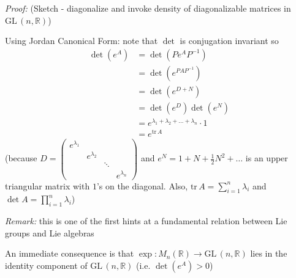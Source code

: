 \documentclass[12pt]{article}
\newcommand{\R}{\mathbb{R}}
\newcommand{\C}{\mathbb{C}}
\newcommand{\GL}{\text{GL}\,}
\newcommand{\tr}{\text{tr}\,}
\newenvironment*{tbox}[2][gray]{
    \begin{tcolorbox}[
        parbox=false,
        colback=#1!5!white,
        colframe=#1!75!black,
        breakable,
        title={#2}
    ]}
    {\end{tcolorbox}}
\begin{document}
    \begin{tbox}{\textbf{Theorem:} $\det(e^A) = e^{\tr A}$ for any matrix $A \in M_n(\C)$}
        \emph{Proof:} (Sketch - diagonalize and invoke density of diagonalizable matrices in $\GL(n, \R)$)

        Using Jordan Canonical Form: note that $\det$ is conjugation invariant so 
        \begin{align*}
            \det(e^A) &= \det(Pe^{A}P^{-1})\\ 
                &= \det(e^{PAP^{-1}})\\ 
                &= \det(e^{D + N})\\ 
                &= \det(e^D)\det(e^N)\\ 
                &= e^{\lambda_1 + \lambda_2 + \dots + \lambda_n} \cdot 1\\
                &= e^{\tr A}
        \end{align*}
        (because $D = \begin{pmatrix}
            e^{\lambda_1}\\ 
            & e^{\lambda_2}\\
            & & \ddots\\
            & & & e^{\lambda_n}
        \end{pmatrix}$ and $e^N = 1 + N + \frac{1}{2}N^2 + \dots$ is an upper triangular matrix with $1$'s on the diagonal. Also, $\tr A = \sum_{i=1}^n \lambda_i$ and $\det A = \prod_{i=1}^n \lambda_i$)
    \end{tbox}

    \emph{Remark:} this is one of the first hints at a fundamental relation between Lie groups and Lie algebras 

    An immediate consequence is that $\exp: M_n(\R) \to \GL(n, \R)$ lies in the identity component of $\GL(n, \R)$ (i.e. $\det(e^A) > 0$)

   
\end{document}
